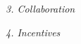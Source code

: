 \documentclass[a4paper,12pt]{article}
\renewcommand{\subsection}[1]{
  \bigskip
  \begin{center}
  \begin{large}
  \normalfont\itshape #1
  \end{large}
  \end{center}
}
\begin{document}
\subsection{3. Collaboration}
\subsection{4. Incentives}











\end{document}
